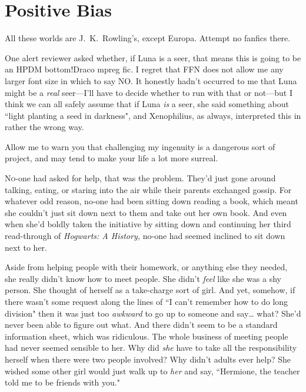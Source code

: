 \chapter{Positive Bias}

\begin{chapterOpeningAuthorNote}
All these worlds are J.~K.~Rowling's, except Europa. Attempt no fanfics there.

One alert reviewer asked whether, if Luna is a seer, that means this is going to be an HPDM bottom!Draco mpreg fic. I regret that FFN does not allow me any larger font size in which to say NO. It honestly hadn't occurred to me that Luna might be a \emph{real} seer—I'll have to decide whether to run with that or not—but I think we can all safely assume that if Luna \emph{is} a seer, she said something about ``light planting a seed in darkness", and Xenophilius, as always, interpreted this in rather the wrong way.
\end{chapterOpeningAuthorNote}
\begin{chapterOpeningQuote}
Allow me to warn you that challenging my ingenuity is a dangerous sort of project, and may tend to make your life a lot more surreal.
\end{chapterOpeningQuote}

\lettrine{N}{o}-one had asked for help, that was the problem. They'd just gone around talking, eating, or staring into the air while their parents exchanged gossip. For whatever odd reason, no-one had been sitting down reading a book, which meant she couldn't just sit down next to them and take out her own book. And even when she'd boldly taken the initiative by sitting down and continuing her third read-through of \emph{Hogwarts: A History,} no-one had seemed inclined to sit down next to her.

Aside from helping people with their homework, or anything else they needed, she really didn't know how to meet people. She didn't \emph{feel} like she was a shy person. She thought of herself as a take-charge sort of girl. And yet, somehow, if there wasn't some request along the lines of ``I can't remember how to do long division" then it was just too \emph{awkward} to go up to someone and say{\ldots} what? She'd never been able to figure out what. And there didn't seem to be a standard information sheet, which was ridiculous. The whole business of meeting people had never seemed sensible to her. Why did \emph{she} have to take all the responsibility herself when there were two people involved? Why didn't adults ever help? She wished some other girl would just walk up to \emph{her} and say, ``Hermione, the teacher told me to be friends with you."

